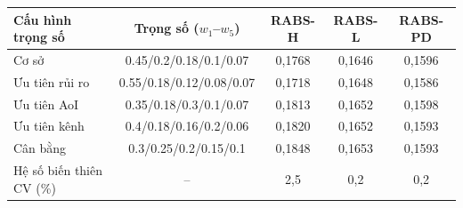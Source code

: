 \begin{tabular}{lcccc}
\hline
Cấu hình trọng số & Trọng số ($w_1$--$w_5$) & RABS-H & RABS-L & RABS-PD \\
\hline
Cơ sở & 0.45/0.2/0.18/0.1/0.07 & 0,1768 & 0,1646 & 0,1596 \\
Ưu tiên rủi ro & 0.55/0.18/0.12/0.08/0.07 & 0,1718 & 0,1648 & 0,1586 \\
Ưu tiên AoI & 0.35/0.18/0.3/0.1/0.07 & 0,1813 & 0,1652 & 0,1598 \\
Ưu tiên kênh & 0.4/0.18/0.16/0.2/0.06 & 0,1820 & 0,1652 & 0,1593 \\
Cân bằng & 0.3/0.25/0.2/0.15/0.1 & 0,1848 & 0,1653 & 0,1593 \\
\hline
Hệ số biến thiên CV (\%) & -- & 2,5 & 0,2 & 0,2 \\
\hline
\end{tabular}
